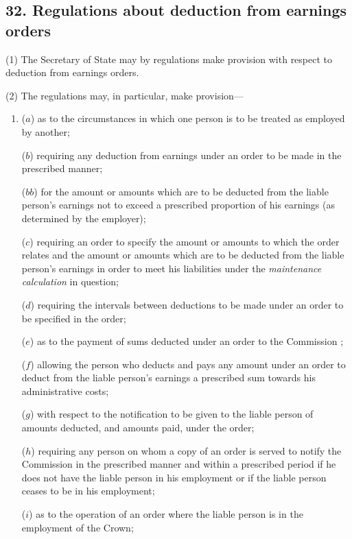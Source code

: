 \documentclass[12pt,a4paper]{article}
\begin{document}
\subsection{32. Regulations about deduction from earnings orders}

(1) The Secretary of State may by regulations make provision with respect to deduction from earnings orders.

(2) The regulations may, in particular, make provision—
\begin{enumerate}\item[]
($a$) as to the circumstances in which one person is to be treated as employed by another;

($b$) requiring any deduction from earnings under an order to be made in the prescribed manner;

($bb$) for the amount or amounts which are to be deducted from the liable person’s earnings not to exceed a prescribed proportion of his earnings (as determined by the employer);

($c$) requiring an order to specify the amount or amounts to which the order relates and the amount or amounts which are to be deducted from the liable person’s earnings in order to meet his liabilities under the 
\emph{maintenance calculation}  %
in question;

($d$) requiring the intervals between deductions to be made under an order to be specified in the order;

($e$) as to the payment of sums deducted under an order to the 
Commission%
;

($f$) allowing the person who deducts and pays any amount under an order to deduct from the liable person’s earnings a prescribed sum towards his administrative costs;

($g$) with respect to the notification to be given to the liable person of amounts deducted, and amounts paid, under the order;

($h$) requiring any person on whom a copy of an order is served to notify the 
Commission  %
in the prescribed manner and within a prescribed period if he does not have the liable person in his employment or if the liable person ceases to be in his employment;

($i$) as to the operation of an order where the liable person is in the employment of the Crown;


\end{enumerate}
\end{document}
